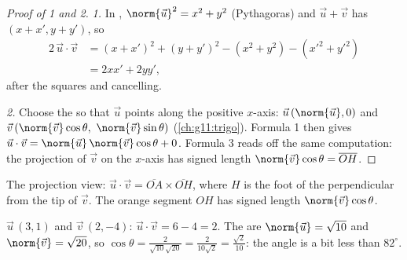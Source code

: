 \begin{proof}[Proof of 1 and 2]
\emph{1.} In , $\norm{\vec u}^2 = x^2 + y^2$ (Pythagoras) and
$\vec u + \vec v$ has  $(x + x', y + y')$, so
\begin{align*}
2\,\vec u \cdot \vec v
&= (x + x')^2 + (y + y')^2 - (x^2 + y^2) - (x'^2 + y'^2)\\
&= 2xx' + 2yy',
\end{align*}
after  the squares and cancelling.

\emph{2.} Choose the  so that $\vec u$ points along the
positive $x$-axis: $\vec u\,(\norm{\vec u}, 0)$ and
$\vec v\,(\norm{\vec v}\cos\theta,\ \norm{\vec v}\sin\theta)$
(\cref{ch:g11:trigo}). Formula 1 then gives
$\vec u \cdot \vec v = \norm{\vec u}\,\norm{\vec v}\cos\theta + 0$.
Formula 3 reads off the same computation: the projection of $\vec v$ on
the $x$-axis has signed length $\norm{\vec v}\cos\theta =
\overline{OH}$.
\end{proof}

\begin{omfigure}

{\small The projection view: $\vec u \cdot \vec v = \overline{OA} \times
\overline{OH}$, where $H$ is the foot of the perpendicular from the tip
of $\vec v$. The orange segment $OH$ has signed length
$\norm{\vec v}\cos\theta$.}
\end{omfigure}

\begin{example}\label{ex:g11:scal:compute}
$\vec u\,(3, 1)$ and $\vec v\,(2, -4)$:
$\vec u \cdot \vec v = 6 - 4 = 2$. The  are
$\norm{\vec u} = \sqrt{10}$ and $\norm{\vec v} = \sqrt{20}$, so
$\cos\theta = \frac{2}{\sqrt{10}\sqrt{20}} = \frac{2}{10\sqrt2}
= \frac{\sqrt2}{10}$: the angle is a bit less than $82^\circ$.
\end{example}

